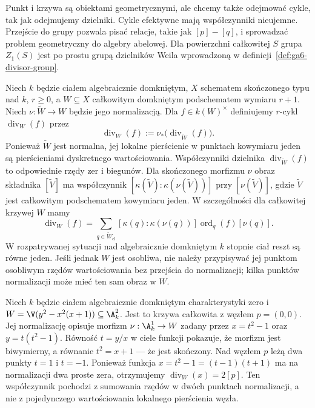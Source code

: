 \begin{uwaga}
Punkt i krzywa są obiektami geometrycznymi, ale chcemy także
odejmować cykle, tak jak odejmujemy dzielniki.
Cykle efektywne mają współczynniki nieujemne.
Przejście do grupy pozwala pisać relacje, takie jak
$[p]-[q]$, i sprowadzać problem geometryczny do algebry abelowej.
Dla powierzchni całkowitej $S$ grupa $Z_1(S)$
jest po prostu grupą dzielników Weila wprowadzoną w
definicji~\ref{def:ga6-divisor-group}.
\end{uwaga}

\begin{definicja}
\label{def:ga7-rational-divisor}
Niech $k$ będzie ciałem algebraicznie domkniętym,
$X$ schematem skończonego typu nad $k$, $r\ge0$,
a $W\subseteq X$ całkowitym domkniętym podschematem
wymiaru $r+1$. Niech $\nu:\widetilde W\to W$
będzie jego normalizacją. Dla $f\in k(W)^\times$ definiujemy
$r$-cykl $\operatorname{div}_W(f)$ przez
\[
\operatorname{div}_W(f):=\nu_*
\bigl(\operatorname{div}_{\widetilde W}(f)\bigr).
\]
Ponieważ $\widetilde W$ jest normalna, jej lokalne
pierścienie w punktach kowymiaru jeden są pierścieniami
dyskretnego wartościowania. Współczynniki dzielnika
$\operatorname{div}_{\widetilde W}(f)$ to odpowiednie rzędy
zer i biegunów. Dla skończonego morfizmu $\nu$ obraz
składnika $[\widetilde V]$ ma współczynnik
$[\kappa(\widetilde V):\kappa(\nu(\widetilde V))]$ przy
$[\nu(\widetilde V)]$, gdzie $\widetilde V$ jest
całkowitym podschematem kowymiaru jeden.
W szczególności dla całkowitej krzywej $W$ mamy
\[
\operatorname{div}_W(f)=
\sum_{q\in\widetilde W_{\mathrm{cl}}}
[\kappa(q):\kappa(\nu(q))]\operatorname{ord}_q(f)[\nu(q)].
\]
W rozpatrywanej sytuacji nad algebraicznie domkniętym
$k$ stopnie ciał reszt są równe jeden. Jeśli jednak
$W$ jest osobliwa, nie należy przypisywać jej punktom
osobliwym rzędów wartościowania bez przejścia
do normalizacji; kilka punktów normalizacji może
mieć ten sam obraz w $W$.
\end{definicja}

\begin{przyklad}
\label{prz:ga7-nodal-divisor}
Niech $k$ będzie ciałem algebraicznie domkniętym
charakterystyki zero i
$W=\V(y^2-x^2(x+1))\subseteq\A_k^2$.
Jest to krzywa całkowita z węzłem $p=(0,0)$.
Jej normalizację opisuje morfizm
$\nu:\A_k^1\to W$ zadany przez
$x=t^2-1$ oraz $y=t(t^2-1)$.
Równość $t=y/x$ w ciele funkcji pokazuje,
że morfizm jest biwymierny, a równanie
$t^2=x+1$ — że jest skończony.
Nad węzłem $p$ leżą dwa punkty $t=1$ i $t=-1$.
Ponieważ funkcja $x=t^2-1=(t-1)(t+1)$
ma na normalizacji dwa proste zera,
otrzymujemy $\operatorname{div}_W(x)=2[p]$.
Ten współczynnik pochodzi z sumowania rzędów
w dwóch punktach normalizacji, a nie z pojedynczego
wartościowania lokalnego pierścienia węzła.
\end{przyklad}

